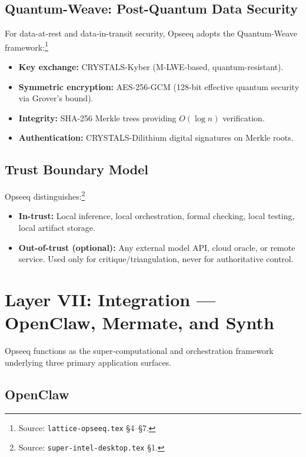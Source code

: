 \documentclass[11pt]{article}
\theoremstyle{remark}
\begin{document}
\subsection{Quantum-Weave: Post-Quantum Data Security}
\label{subsec:quantum_weave}

For data-at-rest and data-in-transit security, Opseeq adopts the Quantum-Weave framework:\footnote{Source: \texttt{lattice-opseeq.tex} \S4--\S7.}

\begin{itemize}
  \item \textbf{Key exchange:} CRYSTALS-Kyber (M-LWE-based, quantum-resistant).
  \item \textbf{Symmetric encryption:} AES-256-GCM (128-bit effective quantum security via Grover's bound).
  \item \textbf{Integrity:} SHA-256 Merkle trees providing $O(\log n)$ verification.
  \item \textbf{Authentication:} CRYSTALS-Dilithium digital signatures on Merkle roots.
\end{itemize}

\subsection{Trust Boundary Model}
\label{subsec:trust}

Opseeq distinguishes:\footnote{Source: \texttt{super-intel-desktop.tex} \S1.}
\begin{itemize}
  \item \textbf{In-trust:} Local inference, local orchestration, formal checking, local testing, local artifact storage.
  \item \textbf{Out-of-trust (optional):} Any external model API, cloud oracle, or remote service. Used only for critique/triangulation, never for authoritative control.
\end{itemize}

\section{Layer VII: Integration --- OpenClaw, Mermate, and Synth}
\label{sec:integration}

Opseeq functions as the super-computational and orchestration framework underlying three primary application surfaces.

\subsection{OpenClaw}
\label{subsec:openclaw}
\end{document}
